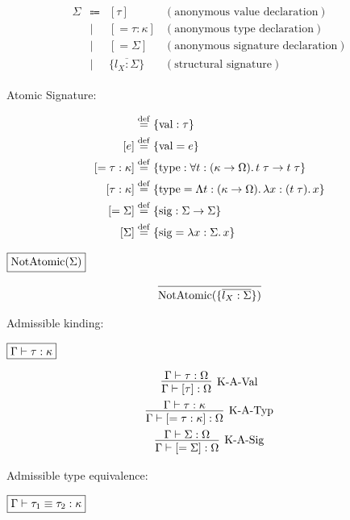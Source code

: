 \begin{align*}
  \begin{array}{rclr}
  \Sigma
  & \Coloneq & [\tau] &(\text{anonymous value declaration}) \\
  & \mid & [= \tau: \kappa] &(\text{anonymous type declaration}) \\
  & \mid & [= \Sigma] &(\text{anonymous signature declaration}) \\
  & \mid & \{\overline{l_X: \Sigma}\} &(\text{structural signature})
  \end{array}
\end{align*}

Atomic Signature:

\begin{align*}
  [\tau] &\defrel{=} \{\symval: \tau\} \\
  [e] &\defrel{=} \{\symval = e\} \\
  [= \tau: \kappa] &\defrel{=} \{\symtype: \forall t: (\kappa \to \Omega)\ldotp t\; \tau \to t\; \tau\} \\
  [\tau: \kappa] &\defrel{=} \{\symtype = \Lambda t: (\kappa \to \Omega)\ldotp \lambda x: (t\; \tau)\ldotp x\} \\
  [= \Sigma] &\defrel{=} \{\symsig: \Sigma \to \Sigma\} \\
  [\Sigma] &\defrel{=} \{\symsig = \lambda x: \Sigma\ldotp x\}
\end{align*}

$\fbox{$\mathop{\mathrm{NotAtomic}}(\Sigma)$}$

\begin{gather*}
  \infer{\symNotAtomic(\{\overline{l_X: \Sigma}\})}{}
\end{gather*}

Admissible kinding:

$\fbox{$\Gamma \vdash \tau: \kappa$}$

\begin{gather*}
  \infer[\text{K-A-Val}]{\Gamma \vdash [\tau]: \Omega}{
    \Gamma \vdash \tau: \Omega
  }
  \\
  \infer[\text{K-A-Typ}]{\Gamma \vdash [= \tau: \kappa]: \Omega}{
    \Gamma \vdash \tau: \kappa
  }
  \\
  \infer[\text{K-A-Sig}]{\Gamma \vdash [= \Sigma]: \Omega}{
    \Gamma \vdash \Sigma: \Omega
  }
\end{gather*}

Admissible type equivalence:

$\fbox{$\Gamma \vdash \tau_1 \equiv \tau_2: \kappa$}$

